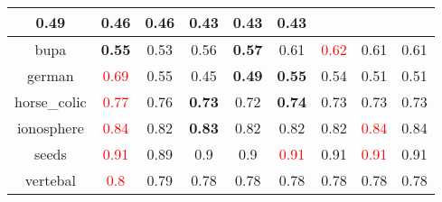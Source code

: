 \documentclass{article}%
\begin{document}
\begin{tabular}{c|cccccccc}
{0.49
}&0.46&\textbf{0.46}&0.43&0.43&0.43\\%
\hline%
bupa&\textbf{0.55}&0.53&0.56&\textbf{0.57}&0.61&\textcolor{red}{ 
0.62
}&0.61&0.61\\%
\hline%
german&\textcolor{red}{ 
0.69
}&0.55&0.45&\textbf{0.49}&\textbf{0.55}&0.54&0.51&0.51\\%
\hline%
horse\_colic&\textcolor{red}{ 
0.77
}&0.76&\textbf{0.73}&0.72&\textbf{0.74}&0.73&0.73&0.73\\%
\hline%
ionosphere&\textcolor{red}{ 
0.84
}&0.82&\textbf{0.83}&0.82&0.82&0.82&\textcolor{red}{ 
0.84
}&0.84\\%
\hline%
seeds&\textcolor{red}{ 
0.91
}&0.89&0.9&0.9&\textcolor{red}{ 
0.91
}&0.91&\textcolor{red}{ 
0.91
}&0.91\\%
\hline%
vertebal&\textcolor{red}{ 
0.8
}&0.79&0.78&0.78&0.78&0.78&0.78&0.78\\%
\hline%
\end{tabular}

%
\end{document}
